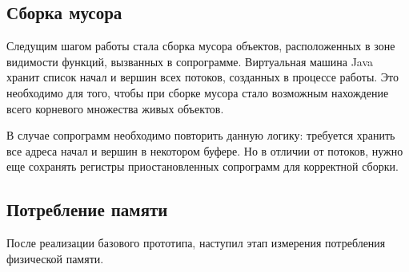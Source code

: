 	\subsection{Сборка мусора}
	Следущим шагом работы стала сборка мусора объектов, расположенных в зоне видимости функций,
	вызванных в сопрограмме. Виртуальная машина Java хранит список начал и вершин всех потоков,
	созданных в процессе работы.
	Это необходимо для того, чтобы при сборке мусора стало возможным нахождение всего
	корневого множества живых объектов. 
	\par
	В случае сопрограмм необходимо повторить данную логику: требуется хранить все адреса начал и вершин в некотором
	буфере. Но в отличии от потоков, нужно еще сохранять регистры приостановленных сопрограмм для корректной сборки. 
	
	\subsection{Потребление памяти}
	После реализации базового прототипа, наступил этап измерения потребления физической памяти. 
		
